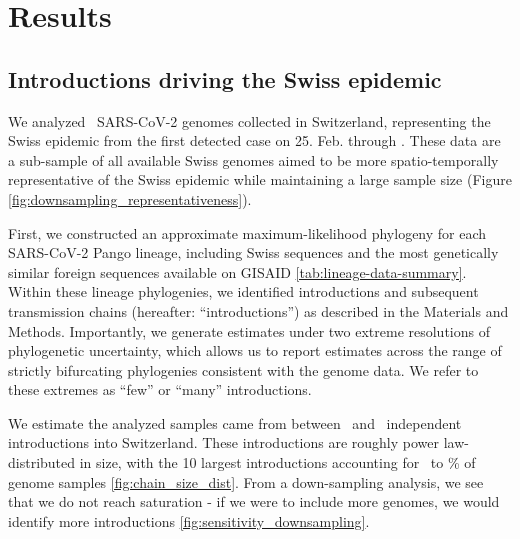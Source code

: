 \documentclass[9pt,twoside,lineno]{pnas-new} %
\begin{document}
\section{Results}

\subsection{Introductions driving the Swiss epidemic}

We analyzed \nfocalsamples\ SARS-CoV-2 genomes collected in Switzerland, representing the Swiss epidemic from the first detected case on 25. Feb. through \maxdate. These data are a sub-sample of all available Swiss genomes aimed to be more spatio-temporally representative of the Swiss epidemic while maintaining a large sample size (Figure  \ref{fig:downsampling_representativeness}). 

First, we constructed an approximate maximum-likelihood phylogeny for each SARS-CoV-2 Pango lineage, including Swiss sequences and the most genetically similar foreign sequences available on GISAID \ref{tab:lineage-data-summary}. Within these lineage phylogenies, we identified introductions and subsequent transmission chains (hereafter: ``introductions'') as described in the Materials and Methods. Importantly, we generate estimates under two extreme resolutions of phylogenetic uncertainty, which allows us to report estimates across the range of strictly bifurcating phylogenies consistent with the genome data. We refer to these extremes as ``few'' or ``many'' introductions.

We estimate the analyzed samples came from between \nchainsmin\ and \nchainsmax\ independent introductions into Switzerland. These introductions are roughly power law-distributed in size, with the 10 largest introductions accounting for \maxlargestchainsper\ to \minlargestchainsper \% of genome samples \ref{fig:chain_size_dist}. From a down-sampling analysis, we see that we do not reach saturation - if we were to include more genomes, we would identify more introductions \ref{fig:sensitivity_downsampling}. 

\end{document}
